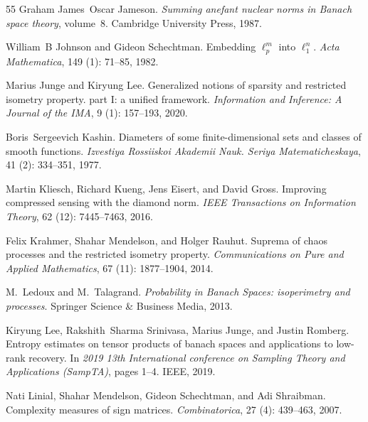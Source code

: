 \documentclass[11pt]{article}
\begin{document}
\begin{thebibliography}{55}
Graham James~Oscar Jameson.
\newblock \emph{Summing anefant nuclear norms in Banach space theory},
  volume~8.
\newblock Cambridge University Press, 1987.

William~B Johnson and Gideon Schechtman.
\newblock Embedding $\ell_p^m$ into $\ell_1^n$.
\newblock \emph{Acta Mathematica}, 149 (1): 71--85, 1982.

Marius Junge and Kiryung Lee.
\newblock Generalized notions of sparsity and restricted isometry property.
  part {I}: a unified framework.
\newblock \emph{Information and Inference: A Journal of the IMA}, 9
  (1): 157--193, 2020.

Boris~Sergeevich Kashin.
\newblock Diameters of some finite-dimensional sets and classes of smooth
  functions.
\newblock \emph{Izvestiya Rossiiskoi Akademii Nauk. Seriya Matematicheskaya},
  41 (2): 334--351, 1977.

Martin Kliesch, Richard Kueng, Jens Eisert, and David Gross.
\newblock Improving compressed sensing with the diamond norm.
\newblock \emph{IEEE Transactions on Information Theory}, 62
  (12): 7445--7463, 2016.

Felix Krahmer, Shahar Mendelson, and Holger Rauhut.
\newblock Suprema of chaos processes and the restricted isometry property.
\newblock \emph{Communications on Pure and Applied Mathematics}, 67
  (11): 1877--1904, 2014.

M.~Ledoux and M.~Talagrand.
\newblock \emph{Probability in Banach Spaces: isoperimetry and processes}.
\newblock Springer Science \& Business Media, 2013.

Kiryung Lee, Rakshith~Sharma Srinivasa, Marius Junge, and Justin Romberg.
\newblock Entropy estimates on tensor products of banach spaces and
  applications to low-rank recovery.
\newblock In \emph{2019 13th International conference on Sampling Theory and
  Applications (SampTA)}, pages 1--4. IEEE, 2019.

Nati Linial, Shahar Mendelson, Gideon Schechtman, and Adi Shraibman.
\newblock Complexity measures of sign matrices.
\newblock \emph{Combinatorica}, 27 (4): 439--463, 2007.


\end{thebibliography}
\end{document}
